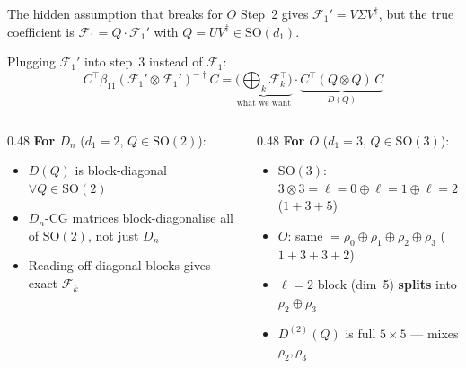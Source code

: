 \documentclass[aspectratio=169]{beamer}
\begin{document}
\begin{frame}{The hidden assumption that breaks for $O$}
  Step~2 gives $\mathcal{F}_1' = V\Sigma V^\dagger$, but the true coefficient
  is $\mathcal{F}_1 = Q \cdot \mathcal{F}_1'$ with $Q = UV^\dagger \in \mathrm{SO}(d_1)$.

  \smallskip

  Plugging $\mathcal{F}_1'$ into step~3 instead of $\mathcal{F}_1$:
  \[
    C^\top \beta_{11} (\mathcal{F}_1' \otimes \mathcal{F}_1')^{-\dagger} C
    = \underbrace{\bigl(\bigoplus_k \mathcal{F}_k^\top\bigr)}_{\text{what we want}}
      \cdot \underbrace{C^\top (Q \otimes Q)\, C}_{D(Q)}
  \]

  \begin{columns}[T]
    \begin{column}{0.48\textwidth}
      \textbf{For $D_n$} ($d_1 = 2$, $Q \in \mathrm{SO}(2)$):
      \begin{itemize}\small
        \item $D(Q)$ is block-diagonal $\forall Q \in \mathrm{SO}(2)$
        \item $D_n$-CG matrices block-diagonalise all of $\mathrm{SO}(2)$, not just $D_n$
        \item Reading off diagonal blocks gives exact $\mathcal{F}_k$
      \end{itemize}
    \end{column}
    \begin{column}{0.48\textwidth}
      \textbf{For $O$} ($d_1 = 3$, $Q \in \mathrm{SO}(3)$):
      \begin{itemize}\small
        \item $\mathrm{SO}(3)$: $3 \otimes 3 = \ell{=}0 \oplus \ell{=}1 \oplus \ell{=}2$ ($1{+}3{+}5$)
        \item $O$: same $= \rho_0 \oplus \rho_1 \oplus \rho_2 \oplus \rho_3$ ($1{+}3{+}3{+}2$)
        \item $\ell{=}2$ block (dim~5) \textbf{splits} into $\rho_2 \oplus \rho_3$
        \item $D^{(2)}(Q)$ is full $5 \times 5$ --- mixes $\rho_2, \rho_3$
      \end{itemize}
    \end{column}
  \end{columns}
\end{frame}
\end{document}
